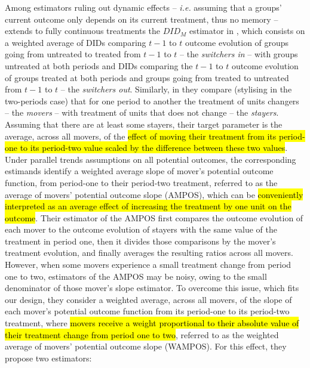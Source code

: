 \documentclass[11pt]{article}
\begin{document}
Among estimators ruling out dynamic effects -- \textit{i.e.} assuming that a groups' current outcome only depends on its current treatment, thus no memory -- \citet{bib:dechaisemartin2022b} extends to fully continuous treatments the $DID_{M}$ estimator in \cite{bib:dechaisemartin2020}, which consists on a weighted average of DIDs comparing $t-1$ to $t$ outcome evolution of groups going from untreated to treated from $t-1$ to $t$ -- the \textit{switchers in} -- with groups untreated at both periods and DIDs comparing the $t-1$ to $t$ outcome evolution of groups treated at both periods and groups going from treated to untreated from $t-1$ to $t$ -- the \textit{switchers out}. Similarly, in \citet{bib:dechaisemartin2022b} they compare (stylising in the two-periods case) that for one period to another the treatment of units changers -- the \textit{movers} -- with treatment of units that does not change -- the \textit{stayers}. Assuming that there are at least some stayers, their target parameter is the average, across all movers, of the \hl{effect of moving their treatment from its period-one to its period-two value scaled by the difference between these two values}. Under parallel trends assumptions on all potential outcomes, the corresponding estimands identify a weighted average slope of mover's potential outcome function, from period-one to their period-two treatment, referred to as the average of movers' potential outcome slope (AMPOS), which can be \hl{conveniently interpreted as an average effect of increasing the treatment by one unit on the outcome}. Their estimator of the AMPOS first compares the outcome evolution of each mover to the outcome evolution of stayers with the same value of the treatment in period one, then it divides those comparisons by the mover's treatment evolution, and finally averages the resulting ratios across all movers.
However, when some movers experience a small treatment change from period one to two, estimators of the AMPOS may be noisy, owing to the small denominator of those mover's slope estimator. To overcome this issue, which fits our design, they consider a weighted average, across all movers, of the slope of each mover's potential outcome function from its period-one to its period-two treatment, where \hl{movers receive a weight proportional to their absolute value of their treatment change from period one to two}, referred to as the weighted average of movers' potential outcome slope (WAMPOS). For this effect, they propose two estimators:
\end{document}
